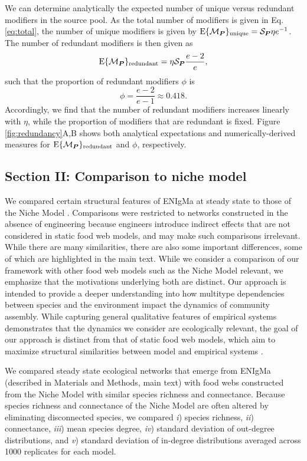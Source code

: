 \documentclass[twocolumn,preprintnumbers,amsmath,amssymb,superscriptaddress]{revtex4}
\newcommand{\rr}[1]{{\rm #1}}
\begin{document}
We can determine analytically the expected number of unique versus redundant modifiers in the source pool.
As the total number of modifiers is given in Eq. \ref{eq:total}, the number of unique modifiers is given by ${\rm E}\{\mathcal{M}_{\bm P}\}_{\rr{unique}} = \mathcal{S}_{\bm P} \eta e^{-1}$.
The number of redundant modifiers is then given as
\begin{equation}
{\rm E}\{\mathcal{M}_{\bm P}\}_{\rr{redundant}} = \eta \mathcal{S}_{\bm P} \frac{e - 2}{e},
\label{eq:redundant}
\end{equation}
such that the proportion of redundant modifiers $\phi$ is
\begin{equation}
\phi = \frac{e-2}{e-1} \approx 0.418.
\label{eq:redundantprop}
\end{equation}
Accordingly, we find that the number of redundant modifiers increases linearly with $\eta$, while the proportion of modifiers that are redundant is fixed.
Figure \ref{fig:redundancy}A,B shows both analytical expectations and numerically-derived measures for ${\rm E}\{\mathcal{M}_{\bm P}\}_{\rr{redundant}}$ and $\phi$, respectively.

\subsection*{Section II: Comparison to niche model}
We compared certain structural features of ENIgMa at steady state to those of the Niche Model \cite{Williams2000}.
Comparisons were restricted to networks constructed in the absence of engineering because engineers introduce indirect effects that are not considered in static food web models, and may make such comparisons irrelevant.
While there are many similarities, there are also some important differences, some of which are highlighted in the main text.
While we consider a comparison of our framework with other food web models such as the Niche Model relevant, we emphasize that the motivations underlying both are distinct.
Our approach is intended to provide a deeper understanding into how multitype dependencies between species and the environment impact the dynamics of community assembly.
While capturing general qualitative features of empirical systems demonstrates that the dynamics we consider are ecologically relevant, the goal of our approach is distinct from that of static food web models, which aim to maximize structural similarities between model and empirical systems \cite{Williams2000,Williams2011}.

We compared steady state ecological networks that emerge from ENIgMa (described in Materials and Methods, main text) with food webs constructed from the Niche Model \cite{Williams2000} with similar species richness and connectance.
Because species richness and connectance of the Niche Model are often altered by eliminating disconnected species, we compared
\emph{i}) species richness,
\emph{ii}) connectance,
\emph{iii}) mean species degree,
\emph{iv}) standard deviation of out-degree distributions, and
\emph{v}) standard deviation of in-degree distributions
averaged across 1000 replicates for each model.
\end{document}
